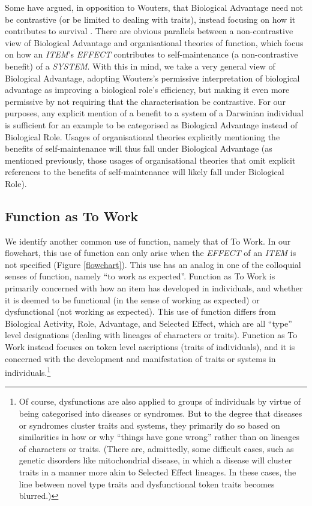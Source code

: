 \documentclass{article}
\begin{document}
Some have argued, in opposition to Wouters, that Biological Advantage need not be contrastive (or be limited to dealing with traits), instead focusing on how it contributes to survival \cite{garson2016, buller1998}.
There are obvious parallels between a non-contrastive view of Biological Advantage and organisational theories of function, which focus on how an \emph{ITEM}'s \emph{EFFECT} contributes to self-maintenance (a non-contrastive benefit) of a \emph{SYSTEM}.
With this in mind, we take a very general view of Biological Advantage, adopting Wouters's permissive interpretation of biological advantage as improving a biological role's efficiency, but making it even more permissive by not requiring that the characterisation be contrastive.
For our purposes, any explicit mention of a benefit to a system of a Darwinian individual is sufficient for an example to be categorised as Biological Advantage instead of Biological Role.
Usages of organisational theories explicitly mentioning the benefits of self-maintenance will thus fall under Biological Advantage (as mentioned previously, those usages of organisational theories that omit explicit references to the benefits of self-maintenance will likely fall under Biological Role).

\subsection{Function as To Work}
\label{sec:funct-as-perf}

We identify another common use of function, namely that of To Work.
In our flowchart, this use of function can only arise when the \emph{EFFECT} of an \emph{ITEM} is not specified (Figure \ref{flowchart}).
This use has an analog in one of the colloquial senses of function, namely ``to work as expected''.
Function as To Work is primarily concerned with how an item has developed in individuals, and whether it is deemed to be functional (in the sense of working as expected) or dysfunctional (not working as expected).
This use of function differs from Biological Activity, Role, Advantage, and Selected Effect, which are all ``type'' level designations (dealing with lineages of characters or traits).
Function as To Work instead focuses on token level ascriptions (traits of individuals), and it is concerned with the development and manifestation of traits or systems in individuals.\footnote{Of course, dysfunctions are also applied to groups of individuals by virtue of being categorised into diseases or syndromes.
But to the degree that diseases or syndromes cluster traits and systems, they primarily do so based on similarities in how or why ``things have gone wrong'' rather than on lineages of characters or traits.
(There are, admittedly, some difficult cases, such as genetic disorders like mitochondrial disease, in which a disease will cluster traits in a manner more akin to Selected Effect lineages. In these cases, the line between novel type traits and dysfunctional token traits becomes blurred.)}
\end{document}
